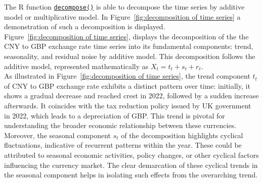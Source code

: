 \documentclass{article}\usepackage[]{graphicx}\usepackage[]{xcolor}
\numberwithin{equation}{section}
\begin{document}
\noindent
The R function \href{https://www.rdocumentation.org/packages/stats/versions/3.6.2/topics/decompose}{\texttt{decompose()}} is able to decompose the time series by additive model or multiplicative model. In Figure~\ref{fig:decomposition of time series} a demonstration of such a decomposition is displayed.\\

\noindent
Figure~\ref{fig:decomposition of time series}, displays the decomposition of the the CNY to GBP exchange rate time series into its fundamental components: trend, seasonality, and residual noise by additive model. This decomposition follows the additive model, represented mathematically as $X_t = t_t + s_t + r_t$.\\

\noindent
As illustrated in Figure~\ref{fig:decomposition of time series}, the trend component $t_t$ of CNY to GBP exchange rate exhibits a distinct pattern over time: initially, it shows a gradual decrease and reached crest in 2022, followed by a sudden increase afterwards. It coincides with the tax reduction policy issued by UK government in 2022, which leads to a depreciation of GBP. This trend is pivotal for understanding the broader economic relationship between these currencies. \\

\noindent
Moreover, the seasonal component $s_t$ of the decomposition highlights cyclical fluctuations, indicative of recurrent patterns within the year. These could be attributed to seasonal economic activities, policy changes, or other cyclical factors influencing the currency market. The clear demarcation of these cyclical trends in the seasonal component helps in isolating such effects from the overarching trend.\\
\end{document}
